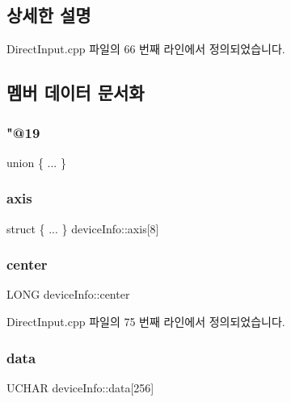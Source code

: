 \subsection{상세한 설명}


Direct\+Input.\+cpp 파일의 66 번째 라인에서 정의되었습니다.



\subsection{멤버 데이터 문서화}
\mbox{\label{structdevice_info_a44f2f54c2a9ac5917b0bb1dce46b15aa}} 
\subsubsection{\texorpdfstring{"@19}{@19}}
{\footnotesize\ttfamily union \{ ... \} }

\mbox{\label{structdevice_info_aa3139c27b267c0ec8b6f4d96629ee0e2}} 
\subsubsection{\texorpdfstring{axis}{axis}}
{\footnotesize\ttfamily struct \{ ... \}   device\+Info\+::axis\mbox{[}8\mbox{]}}

\mbox{\label{structdevice_info_a06a2e7b32ae7d9ca107f65b56920da72}} 
\subsubsection{\texorpdfstring{center}{center}}
{\footnotesize\ttfamily L\+O\+NG device\+Info\+::center}



Direct\+Input.\+cpp 파일의 75 번째 라인에서 정의되었습니다.

\mbox{\label{structdevice_info_a24db93457c0c8b0c0461e3db1c55ad48}} 
\subsubsection{\texorpdfstring{data}{data}}
{\footnotesize\ttfamily U\+C\+H\+AR device\+Info\+::data\mbox{[}256\mbox{]}}



